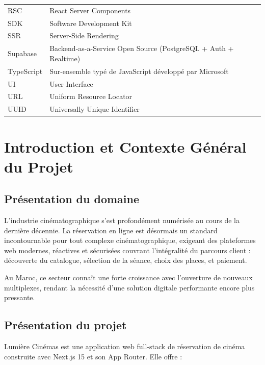 \documentclass[12pt,a4paper,openany]{report}
\begin{document}
\begin{longtable}{lp{10cm}}
  RSC            & React Server Components \\
  SDK            & Software Development Kit \\
  SSR            & Server-Side Rendering \\
  Supabase       & Backend-as-a-Service Open Source (PostgreSQL + Auth + Realtime) \\
  TypeScript     & Sur-ensemble typé de JavaScript développé par Microsoft \\
  UI             & User Interface \\
  URL            & Uniform Resource Locator \\
  UUID           & Universally Unique Identifier \\
\end{longtable}

\newpage

\chapter{Introduction et Contexte Général du Projet}

\section{Présentation du domaine}

L'industrie cinématographique s'est profondément numérisée au cours de la dernière décennie. La réservation en ligne est désormais un standard incontournable pour tout complexe cinématographique, exigeant des plateformes web modernes, réactives et sécurisées couvrant l'intégralité du parcours client : découverte du catalogue, sélection de la séance, choix des places, et paiement.

Au Maroc, ce secteur connaît une forte croissance avec l'ouverture de nouveaux multiplexes, rendant la nécessité d'une solution digitale performante encore plus pressante.

\section{Présentation du projet}

Lumière Cinémas est une application web full-stack de réservation de cinéma construite avec Next.js 15 et son App Router. Elle offre :
\end{document}
